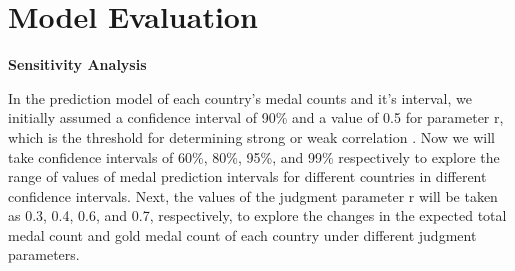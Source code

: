 \documentclass{mcmthesis}  %
\begin{document}
\section{Model Evaluation}
\textbf{Sensitivity Analysis}

In the prediction model of each country's medal counts and it's interval, we initially assumed a confidence interval of 90\% and a value of 0.5 for parameter r, which is the threshold for determining strong or weak correlation . Now we will take confidence intervals of 60\%, 80\%, 95\%, and 99\% respectively to explore the range of values of medal prediction intervals for different countries in different confidence intervals. Next, the values of the judgment parameter r will be taken as 0.3, 0.4, 0.6, and 0.7, respectively, to explore the changes in the expected total medal count and gold medal count of each country under different judgment parameters.
\end{document}
